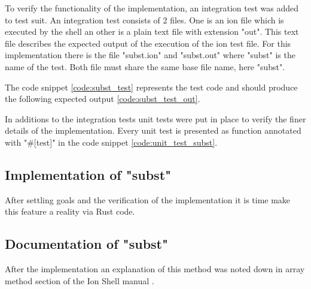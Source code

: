 To verify the functionality of the implementation, an integration test was added to test suit.
An integration test consists of 2 files. One is an ion file which is executed by the shell an other is a plain text file with extension "out".
This text file describes the expected output of the execution of the ion test file.
For this implementation there is the file "subst.ion" and "subst.out"
where "subst" is the name of the test. Both file must share the same base file name, here "subst".

The code snippet \ref{code:subst_test} represents the test code and should
produce the following expected output \ref{code:subst_test_out}.

In additions to the integration tests unit tests were put in place to verify the finer details of the implementation.
Every unit test is presented as function annotated with "\#[test]" in the code snippet \ref{code:unit_test_subst}.



\subsection{Implementation of "subst"}

After settling goals and the verification of the implementation it is time make this feature a reality via Rust code.

\subsection{Documentation of "subst"}

After the implementation an explanation of this method was noted down in array method section of the Ion Shell manual \cite{ion_manual_array_methods}.

